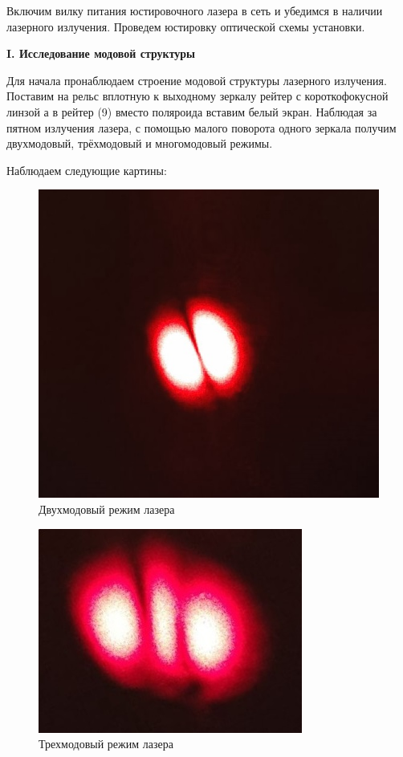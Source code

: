 \documentclass[a4paper,12pt]{article} %
\begin{document}
	Включим вилку питания юстировочного лазера в сеть и убедимся в наличии лазерного излучения. Проведем юстировку оптической схемы установки.
	
	\begin{center}
		\textbf{I. Исследование модовой структуры}
	\end{center}
	
	Для начала пронаблюдаем строение модовой структуры лазерного излучения. Поставим на рельс вплотную к выходному зеркалу рейтер с короткофокусной линзой а в рейтер (9) вместо поляроида вставим белый экран. Наблюдая за пятном излучения лазера, с помощью малого поворота одного зеркала получим двухмодовый, трёхмодовый и многомодовый режимы.
	
	Наблюдаем следующие картины:
	
	\begin{figure}[h!]
		\centering
		\includegraphics[scale=1.2]{Pictures/Двухмодовый}
		\caption{Двухмодовый режим лазера}
	\end{figure}

	\newpage
	
	\begin{figure}[h!]
		\centering
		\includegraphics[scale=1.9]{Pictures/Трехмодовый}
		\caption{Трехмодовый режим лазера}
	\end{figure}
\end{document}
